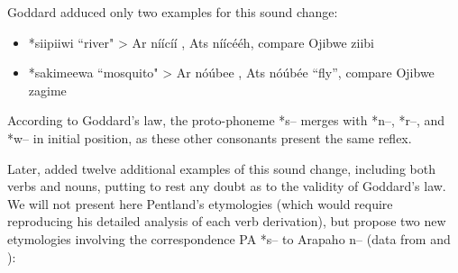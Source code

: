 \documentclass[oldfontcommands,oneside,a4paper,11pt]{article}
\newcommand{\ipa}[1]{{\phon #1}} %
\begin{document}
Goddard adduced only two examples for this sound change:

\begin{itemize}


\item *siipiiwi ``river" >  Ar \ipa{níícíí} , Ats \ipa{níícééh}, compare Ojibwe \ipa{ziibi}

\item *sakimeewa ``mosquito" > Ar \ipa{nóúbee} , Ats \ipa{nóúbée} ``fly'', compare Ojibwe \ipa{zagime}
\end{itemize}

According to Goddard's law, the proto-phoneme *s-- merges with *n--, *r--, and *w-- in initial position, as these other consonants present the same reflex.

Later, \citet{pentland98} added twelve additional examples of this sound change, including both verbs and nouns, putting to rest any doubt as to the validity of Goddard's law. We will not present here Pentland's etymologies (which would require reproducing his detailed analysis of each verb derivation), but propose two new etymologies involving the correspondence PA *s-- to Arapaho n-- (data from \citealt{conathan06arapaho} and \citealt{salzmann83dico}):
\end{document}
